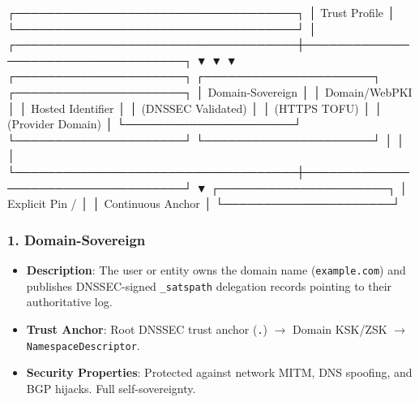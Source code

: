 \documentclass[
]{article}
\newenvironment{Shaded}{}{}
\newcommand{\NormalTok}[1]{#1}
\providecommand{\tightlist}{%
  \setlength{\itemsep}{0pt}\setlength{\parskip}{0pt}}
\begin{document}
\begin{Shaded}
\begin{Highlighting}[]
\NormalTok{                                   ┌───────────────────────────────────┐}
\NormalTok{                                   │           Trust Profile           │}
\NormalTok{                                   └───────────────────────────────────┘}
\NormalTok{                                                     │}
\NormalTok{                 ┌───────────────────────────────────┼───────────────────────────────────┐}
\NormalTok{                 ▼                                   ▼                                   ▼}
\NormalTok{      ┌─────────────────────┐             ┌─────────────────────┐             ┌─────────────────────┐}
\NormalTok{      │   Domain{-}Sovereign  │             │    Domain/WebPKI    │             │  Hosted Identifier  │}
\NormalTok{      │  (DNSSEC Validated) │             │   (HTTPS TOFU)      │             │  (Provider Domain)  │}
\NormalTok{      └─────────────────────┘             └─────────────────────┘             └─────────────────────┘}
\NormalTok{                 │                                   │                                   │}
\NormalTok{                 └───────────────────────────────────┼───────────────────────────────────┘}
\NormalTok{                                                     ▼}
\NormalTok{                                          ┌─────────────────────┐}
\NormalTok{                                          │  Explicit Pin /     │}
\NormalTok{                                          │  Continuous Anchor  │}
\NormalTok{                                          └─────────────────────┘}
\end{Highlighting}
\end{Shaded}

\hypertarget{domain-sovereign}{%
\subsubsection{1. Domain-Sovereign}\label{domain-sovereign}}

\begin{itemize}
\tightlist
\item
  \textbf{Description}: The user or entity owns the domain name
  (\texttt{example.com}) and publishes DNSSEC-signed \texttt{\_satspath}
  delegation records pointing to their authoritative log.
\item
  \textbf{Trust Anchor}: Root DNSSEC trust anchor (\texttt{.})
  \(\rightarrow\) Domain KSK/ZSK \(\rightarrow\)
  \texttt{NamespaceDescriptor}.
\item
  \textbf{Security Properties}: Protected against network MITM, DNS
  spoofing, and BGP hijacks. Full self-sovereignty.
\end{itemize}
\end{document}

